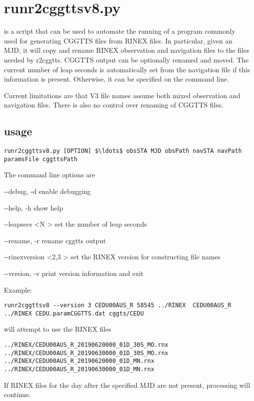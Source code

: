 
\section{runr2cggttsv8.py}

\hypertarget{h:runr2cggttsv8}{}

 is a script that can be used to automate the running of
 a program commonly used for generating CGGTTS files from RINEX files.
In particular, given an MJD, it will copy and rename RINEX observation and navigation files
to the files needed by r2cggtts. CGGTTS output can be optionally renamed and moved.
The current number of leap seconds is automatically set from the navigation file if this
information is present. Otherwise, it can be specified on the command line.

Current limitations are that V3 file names assume both mixed observation and navigation files.
There is also no control over renaming of CGGTTS files. 

\subsection{usage}

\begin{lstlisting}[mathescape=true]
runr2cggttsv8.py [OPTION] $\ldots$ obsSTA MJD obsPath navSTA navPath paramsFile cggttsPath
\end{lstlisting}

The command line options are
\begin{description*}
	\item[-{}-debug, -d]   enable debugging 
	\item[-{}-help, -h]    show help
	\item[-{}-leapsecs \textless N \textgreater ] set the number of leap seconds
	\item[-{}-rename, -r]  rename cggtts output
	\item[-{}-rinexversion \textless 2,3 \textgreater ]  set the RINEX version for constructing file names
	\item[-{}-version, -v] print version information	and exit
\end{description*}
Example:
\begin{lstlisting}
runr2cggttsv8 --version 3 CEDU00AUS_R 58545 ../RINEX  CEDU00AUS_R ../RINEX CEDU.paramCGGTTS.dat cggts/CEDU 
\end{lstlisting}
will attempt to use the RINEX files
\begin{lstlisting}
../RINEX/CEDU00AUS_R_20190620000_01D_30S_MO.rnx
../RINEX/CEDU00AUS_R_20190630000_01D_30S_MO.rnx
../RINEX/CEDU00AUS_R_20190620000_01D_MN.rnx
../RINEX/CEDU00AUS_R_20190630000_01D_MN.rnx
\end{lstlisting}
If RINEX files for the day after the specified MJD are not present, processing will continue.


